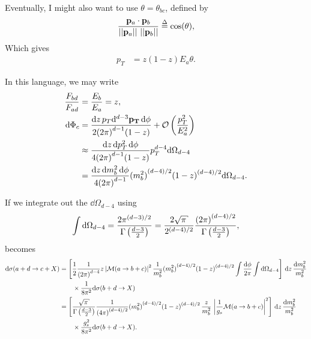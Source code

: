 \begin{subappendices}
Eventually, I might also want to use \(\theta = \theta_{bc}\), defined by
\begin{align}
    \frac{
        \mathbf{p}_a \cdot \mathbf{p}_b
    }{
        ||\mathbf{p}_a||\,\,||\mathbf{p}_b||
    }
    \overset{\Delta}{=}
    \cos(\theta)
    ,
\end{align}
Which gives 
\begin{align}
    p_T  &= z(1-z) E_a \theta
    .
\end{align}


In this language, we may write
\begin{align}
    \frac{F_{bd}}{F_{ad}} &= \frac{E_b}{E_a} = z
    ,
    \\
    \dd\Phi_c &=
    \frac{\dd z \, p_T \dd^{d-3}\mathbf{p_T} \, \dd\phi}
    {2 {(2\pi)}^{d-1} (1-z)}
    + \mathcal{O}\left(\frac{p_T^2}{E_a^2}\right)
    \\
    &\approx
    \frac{\dd z\, \dd p_T^2 \, \dd \phi}
    {4 {(2\pi)}^{d-1} (1-z)}
    p_T^{d-4} \dd\Omega_{d-4}
    \\
    &=
    \frac{\dd z\, \dd m_b^2 \, \dd \phi}{4 {(2\pi)}^{d-1}}
    {(m_b^2)}^{(d-4)/2} {(1-z)}^{(d-4)/2} \dd\Omega_{d-4}
    .
\end{align}

If we integrate out the \(\dd\Omega_{d-4}\) using
\begin{align}
    \int\dd\Omega_{d-4}
    =
    \frac{2\pi^{(d-3)/2}}
    {\Gamma\le(\frac{d-3}{2}\ri)}
    =
    \frac{2\sqrt{\pi}}{2^{(d-4)/2}}
    \frac{{(2\pi)}^{(d-4)/2}}{\Gamma\le(\frac{d-3}{2}\ri)}
    ,
\end{align}
 becomes
\begin{align}
    \dd\sigma(a + d \to c + X)
    &=
    \le[
        \frac{1}{2}
        \frac{1}{{(2\pi)}^{d-4}}
        z
        \le| \mathcal{M}(a \to b + c) \ri|^2
        \frac{1}{m_b^2}
        {(m_b^2)}^{(d-4)/2} {(1-z)}^{(d-4)/2}
        \int\frac{\dd \phi}{2\pi}
        \int\dd\Omega_{d-4}
    \ri]
    \,\dd z\,
    \frac{\dd m_b^2}{m_b^2}
    \\
    \notag{}
    &\qquad\times
    \frac{1}{8\pi^2}
    \dd\sigma(b + d \to X)
    \\
    &=
    \le[
        \frac{\sqrt{\pi}}
        {\Gamma\le(\frac{d-3}{2}\ri)}
        \frac{1}{{(4\pi)}^{(d-4)/2}}
        {(m_b^2)}^{(d-4)/2}
        {(1-z)}^{(d-4)/2}
        \,
        \frac{z}{m_b^2}
        \,
        \le| \frac{1}{g_s} \mathcal{M}(a \to b + c) \ri|^2
    \ri]
    \,\dd z\,
    \frac{\dd m_b^2}{m_b^2}
    \\
    \notag{}
    &\qquad\times
    \frac{g_s^2}{8\pi^2}
    \dd\sigma(b + d \to X)
    .
\end{align}


\end{subappendices}

